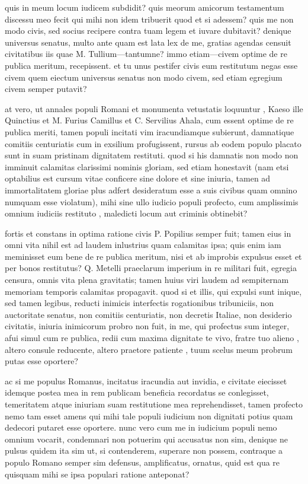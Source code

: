  quis in meum locum iudicem subdidit? quis meorum amicorum testamentum discessu meo fecit qui mihi non idem tribuerit quod et si adessem? quis me non modo civis, sed socius recipere contra tuam legem et iuvare dubitavit? denique universus senatus, multo ante quam est lata lex de me, gratias agendas censuit civitatibus iis quae M. Tullium—tantumne? immo etiam—civem optime de re publica meritum, recepissent. et tu unus pestifer civis eum restitutum negas esse civem quem eiectum universus senatus non modo civem, sed etiam egregium civem semper putavit?

 at vero, ut annales populi Romani et monumenta vetustatis loquuntur , Kaeso ille Quinctius et M. Furius Camillus et C. Servilius Ahala, cum essent optime de re publica meriti, tamen populi incitati vim iracundiamque subierunt, damnatique comitiis centuriatis cum in exsilium profugissent, rursus ab eodem populo placato sunt in suam pristinam dignitatem restituti. quod si his damnatis non modo non imminuit calamitas clarissimi nominis gloriam, sed etiam honestavit (nam etsi optabilius est cursum vitae conficere sine dolore et sine iniuria, tamen ad immortalitatem gloriae plus adfert desideratum esse a suis civibus quam omnino numquam esse violatum), mihi sine ullo iudicio populi profecto, cum amplissimis omnium iudiciis restituto , maledicti locum aut criminis obtinebit?

 fortis et constans in optima ratione civis P. Popilius semper fuit; tamen eius in omni vita nihil est ad laudem inlustrius quam calamitas ipsa; quis enim iam meminisset eum bene de re publica meritum, nisi et ab improbis expulsus esset et per bonos restitutus? Q. Metelli praeclarum imperium in re militari fuit, egregia censura, omnis vita plena gravitatis; tamen huius viri laudem ad sempiternam memoriam temporis calamitas propagavit. quod si et illis, qui expulsi sunt inique, sed tamen legibus, reducti inimicis interfectis rogationibus tribuniciis, non auctoritate senatus, non comitiis centuriatis, non decretis Italiae, non desiderio civitatis, iniuria inimicorum probro non fuit, in me, qui profectus sum integer, afui simul cum re publica, redii cum maxima dignitate te vivo, fratre tuo alieno , altero consule reducente, altero praetore patiente , tuum scelus meum probrum putas esse oportere?

 ac si me populus Romanus, incitatus iracundia aut invidia, e civitate eiecisset idemque postea mea in rem publicam beneficia recordatus se conlegisset, temeritatem atque iniuriam suam restitutione mea reprehendisset, tamen profecto nemo tam esset amens qui mihi tale populi iudicium non dignitati potius quam dedecori putaret esse oportere. nunc vero cum me in iudicium populi nemo omnium vocarit, condemnari non potuerim qui accusatus non sim, denique ne pulsus quidem ita sim ut, si contenderem, superare non possem, contraque a populo Romano semper sim defensus, amplificatus, ornatus, quid est qua re quisquam mihi se ipsa populari ratione anteponat?


